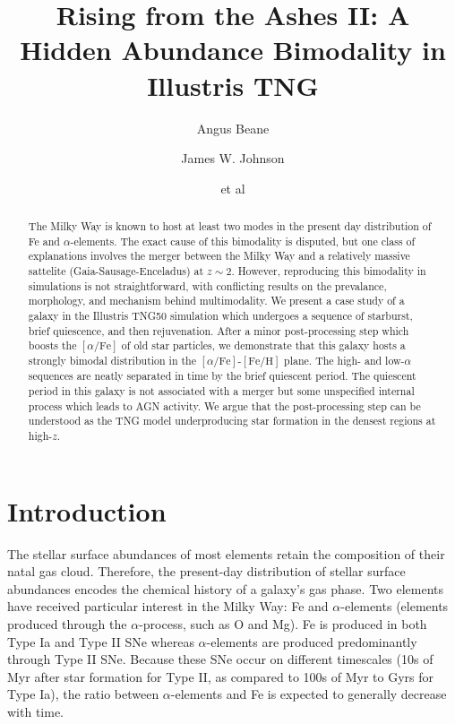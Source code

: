 \documentclass[linenumbers, twocolumn]{aastex631}
\newcommand{\FeH}{\ensuremath{[\textrm{Fe}/\textrm{H}]}}
\newcommand{\alphaFe}{\ensuremath{[\alpha/\textrm{Fe}]}}
\begin{document}
\title{Rising from the Ashes II: A Hidden Abundance Bimodality in Illustris TNG}

\author{Angus Beane}

\author{James W. Johnson}

\author{et al}

\begin{abstract}
    The Milky Way is known to host at least two modes in the present day distribution of Fe and $\alpha$-elements. The exact cause of this bimodality is disputed, but one class of explanations involves the merger between the Milky Way and a relatively massive sattelite (Gaia-Sausage-Enceladus) at $z\sim2$. However, reproducing this bimodality in simulations is not straightforward, with conflicting results on the prevalance, morphology, and mechanism behind multimodality. We present a case study of a galaxy in the Illustris TNG50 simulation which undergoes a sequence of starburst, brief quiescence, and then rejuvenation. After a minor post-processing step which boosts the \alphaFe{} of old star particles, we demonstrate that this galaxy hosts a strongly bimodal distribution in the \alphaFe{}-\FeH{} plane. The high- and low-$\alpha$ sequences are neatly separated in time by the brief quiescent period. The quiescent period in this galaxy is not associated with a merger but some unspecified internal process which leads to AGN activity. We argue that the post-processing step can be understood as the TNG model underproducing star formation in the densest regions at high-$z$.
  \end{abstract}
    
  

\section{Introduction}\label{sec:intro}
The stellar surface abundances of most elements retain the composition of their natal gas cloud. Therefore, the present-day distribution of stellar surface abundances encodes the chemical history of a galaxy's gas phase. Two elements have received particular interest in the Milky Way: Fe and $\alpha$-elements (elements produced through the $\alpha$-process, such as O and Mg). Fe is produced in both Type Ia and Type II SNe whereas $\alpha$-elements are produced predominantly through Type II SNe. Because these SNe occur on different timescales (10s of Myr after star formation for Type II, as compared to 100s of Myr to Gyrs for Type Ia), the ratio between $\alpha$-elements and Fe is expected to generally decrease with time.
\end{document}
